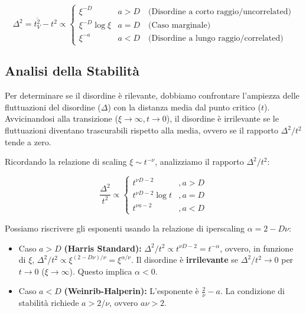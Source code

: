 \begin{equation}
\Delta^2 = \overline{t_V^2} - t^2 \propto 
\begin{cases} 
\xi^{-D} & a > D \quad \text{(Disordine a corto raggio/uncorrelated)} \\
\xi^{-D} \log \xi & a = D \quad \text{(Caso marginale)} \\
\xi^{-a} & a < D \quad \text{(Disordine a lungo raggio/correlated)}
\end{cases}
\end{equation}

\subsection{Analisi della Stabilità}

Per determinare se il disordine è rilevante, dobbiamo confrontare l'ampiezza delle fluttuazioni del disordine ($\Delta$) con la distanza media dal punto critico ($t$). Avvicinandosi alla transizione ($\xi \to \infty, t \to 0$), il disordine è irrilevante se le fluttuazioni diventano trascurabili rispetto alla media, ovvero se il rapporto $\Delta^2 / t^2$ tende a zero.

\noindent Ricordando la relazione di scaling $\xi \sim t^{-\nu}$, analizziamo il rapporto $\Delta^2 / t^2$:

\begin{equation}
\frac{\Delta^2}{t^2} \propto \begin{cases} 
t^{\nu D - 2} & , a > D \\
t^{\nu D - 2} \log t & , a = D \\
t^{\nu a - 2} & , a < D
\end{cases}
\end{equation}

Possiamo riscrivere gli esponenti usando la relazione di iperscaling $\alpha = 2 - D\nu$:
\begin{itemize}
    \item Caso $a > D$ \textbf{(Harris Standard):} $\Delta^2/t^2 \propto t^{\nu D - 2} = t^{-\alpha}$, ovvero, in funzione di $\xi$, $\Delta^2/t^2 \propto \xi^{(2 - D\nu)/\nu} = \xi^{\alpha/\nu}$.
    Il disordine è \textbf{irrilevante} se $\Delta^2/t^2 \to 0$ per $t \to 0$ ($\xi \to \infty$). Questo implica $\alpha < 0$.
    \item Caso $a < D$ \textbf{(Weinrib-Halperin):} L'esponente è $\frac{2}{\nu} - a$. La condizione di stabilità richiede $a > 2/\nu$, ovvero $a\nu > 2$.
\end{itemize}

